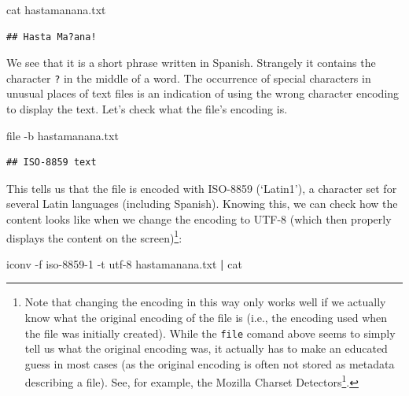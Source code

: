 \documentclass[
  12pt,
]{style/krantz}
\newenvironment{Shaded}{\begin{snugshade}}{\end{snugshade}}
\newcommand{\AttributeTok}[1]{\textcolor[rgb]{0.77,0.63,0.00}{#1}}
\newcommand{\ExtensionTok}[1]{#1}
\newcommand{\FunctionTok}[1]{\textcolor[rgb]{0.00,0.00,0.00}{#1}}
\newcommand{\KeywordTok}[1]{\textcolor[rgb]{0.13,0.29,0.53}{\textbf{#1}}}
\newcommand{\NormalTok}[1]{#1}
\renewcommand{\href}[2]{#2\footnote{\url{#1}}}
\begin{document}
\begin{Shaded}
\begin{Highlighting}[]
\FunctionTok{cat}\NormalTok{ hastamanana.txt}
\end{Highlighting}
\end{Shaded}

\begin{verbatim}
## Hasta Ma?ana!
\end{verbatim}

We see that it is a short phrase written in Spanish. Strangely it contains the character \texttt{?} in the middle of a word. The occurrence of special characters in unusual places of text files is an indication of using the wrong character encoding to display the text. Let's check what the file's encoding is.

\begin{Shaded}
\begin{Highlighting}[]
\FunctionTok{file} \AttributeTok{{-}b}\NormalTok{ hastamanana.txt}
\end{Highlighting}
\end{Shaded}

\begin{verbatim}
## ISO-8859 text
\end{verbatim}

This tells us that the file is encoded with ISO-8859 (`Latin1'), a character set for several Latin languages (including Spanish). Knowing this, we can check how the content looks like when we change the encoding to UTF-8 (which then properly displays the content on the screen)\footnote{Note that changing the encoding in this way only works well if we actually know what the original encoding of the file is (i.e., the encoding used when the file was initially created). While the \texttt{file} comand above seems to simply tell us what the original encoding was, it actually has to make an educated guess in most cases (as the original encoding is often not stored as metadata describing a file). See, for example, the \href{https://www-archive.mozilla.org/projects/intl/chardet.html}{Mozilla Charset Detectors}.}:

\begin{Shaded}
\begin{Highlighting}[]
\ExtensionTok{iconv} \AttributeTok{{-}f}\NormalTok{ iso{-}8859{-}1 }\AttributeTok{{-}t}\NormalTok{ utf{-}8 hastamanana.txt }\KeywordTok{|} \FunctionTok{cat}
\end{Highlighting}
\end{Shaded}
\end{document}
